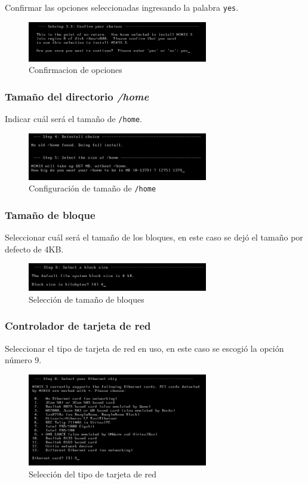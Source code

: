 \documentclass[12pt]{scrartcl}
\begin{document}
Confirmar las opciones seleccionadas ingresando la palabra \texttt{yes}.
\begin{figure}[H]
  \centering
  \includegraphics[width=0.7\textwidth]{vm/min22.png}
  \caption{Confirmacion de opciones}
\end{figure}

\subsubsection{Tamaño del directorio \textit{/home}}
Indicar cuál será el tamaño de \texttt{/home}.
\begin{figure}[H]
  \centering
  \includegraphics[width=0.7\textwidth]{vm/min24.png}
  \caption{Configuración de tamaño de \texttt{/home}}
\end{figure}

\subsubsection{Tamaño de bloque}
Seleccionar cuál será el tamaño de los bloques, en este caso se dejó el tamaño por defecto de 4KB.
\begin{figure}[H]
  \centering
  \includegraphics[width=0.7\textwidth]{vm/min26.png}
  \caption{Selección de tamaño de bloques}
\end{figure}

\subsubsection{Controlador de tarjeta de red}
Seleccionar el tipo de tarjeta de red en uso, en este caso se escogió la opción número 9.
\begin{figure}[H]
  \centering
  \includegraphics[width=0.7\textwidth]{vm/min27.png}
  \caption{Selección del tipo de tarjeta de red}
\end{figure}
\end{document}
